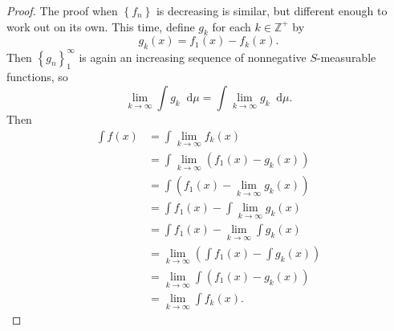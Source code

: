 \documentclass[12pt]{article}
\newcommand{\dd}{\mathop{}\!\mathrm{d}}
\theoremstyle{definition}
\begin{document}
\begin{proof}
	The proof when $\left\lbrace f_n \right\rbrace$ is decreasing is similar, but different enough to work out on its own.
	This time, define $g_k$ for each $k \in \mathbb{Z}^+$ by \begin{equation*}
		g_k(x) = f_1(x) - f_k(x).
	\end{equation*}
	Then $\left\lbrace g_n \right\rbrace_1^\infty$ is again an increasing sequence of nonnegative $S$-measurable functions, so \begin{equation*}
		\lim_{k \to \infty} \int g_k \dd \mu = \int \lim_{k \to \infty} g_k \dd \mu.
	\end{equation*}
	Then \begin{align*}
		\int f(x) & = \int \lim_{k \to \infty} f_k(x)                               \\
		          & = \int \lim_{k \to \infty} \left( f_1(x) - g_k(x) \right)       \\
		          & = \int \left( f_1(x) - \lim_{k \to \infty} g_k(x) \right)       \\
		          & = \int f_1(x) - \int \lim_{k \to \infty} g_k(x)                 \\
		          & = \int f_1(x) - \lim_{k \to \infty} \int  g_k(x)                \\
		          & =  \lim_{k \to \infty} \left( \int f_1(x) - \int g_k(x) \right) \\
		          & =  \lim_{k \to \infty} \int \left( f_1(x) - g_k(x) \right)      \\
		          & =  \lim_{k \to \infty} \int f_k(x).
	\end{align*}
\end{proof}
\end{document}
